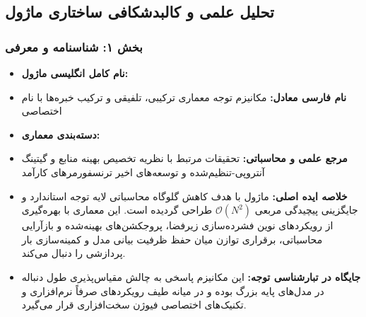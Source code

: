 \subsection{تحلیل علمی و کالبدشکافی ساختاری ماژول }
\label{sec:wgqa}

\subsubsection*{بخش ۱: شناسنامه و معرفی }
\begin{itemize}
    \item \textbf{نام کامل انگلیسی ماژول:} 
    \item \textbf{نام فارسی معادل:} مکانیزم توجه معماری ترکیبی، تلفیقی و ترکیب خبره‌ها  با نام اختصاصی 
    \item \textbf{دسته‌بندی معماری:} 
    \item \textbf{مرجع علمی و محاسباتی:} تحقیقات مرتبط با نظریه تخصیص بهینه منابع و گیتینگ آنتروپی-تنظیم‌شده و توسعه‌های اخیر ترنسفورمرهای کارآمد
    \item \textbf{خلاصه ایده اصلی:} ماژول  با هدف کاهش گلوگاه محاسباتی لایه توجه استاندارد و جایگزینی پیچیدگی مربعی $\mathcal{O}(N^2)$ طراحی گردیده است. این معماری با بهره‌گیری از رویکردهای نوین فشرده‌سازی زیرفضا، پروجکشن‌های بهینه‌شده و بازآرایی محاسباتی، برقراری توازن میان حفظ ظرفیت بیانی مدل و کمینه‌سازی بار پردازشی را دنبال می‌کند.
    \item \textbf{جایگاه در تبارشناسی توجه:} این مکانیزم پاسخی به چالش مقیاس‌پذیری طول دنباله در مدل‌های پایه بزرگ بوده و در میانه طیف رویکردهای صرفاً نرم‌افزاری و تکنیک‌های اختصاصی فیوژن سخت‌افزاری قرار می‌گیرد.
\end{itemize}

